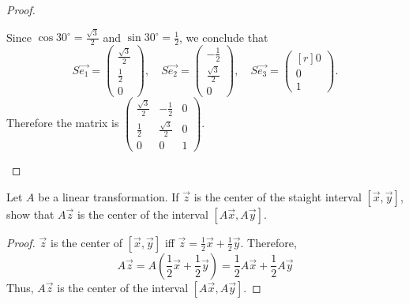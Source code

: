\documentclass{article}
\begin{document}
\begin{proof}
\begin{enumerate}
\begin{center}
      \end{center}
      Since $\cos30^\circ=\frac{\sqrt{3}}{2}$ and $\sin30^\circ=\frac{1}{2}$,
      we conclude that
      \[
        S\vec{e_1}= \begin{pmatrix} \frac{\sqrt{3}}{2}\\[0.2cm]\frac{1}{2}\\[0.2cm]0 \end{pmatrix},\quad
        S\vec{e_2}= \begin{pmatrix} -\frac{1}{2}\\[0.2cm]\frac{\sqrt{3}}{2}\\[0.2cm]0 \end{pmatrix},\quad
        S\vec{e_3}= \begin{pmatrix*}[r] 0\\0\\1 \end{pmatrix*}.
      \]
      Therefore the matrix is
      $ \begin{pmatrix}
        \frac{\sqrt{3}}{2} & -\frac{1}{2} & 0\\[0.2cm]
        \frac{1}{2} & \frac{\sqrt{3}}{2} & 0\\[0.2cm]
        0 & 0 &1
      \end{pmatrix}. $
  \end{enumerate}
\end{proof}
\begin{exercise}
  Let $A$ be a linear transformation. If $\vec{z}$ is the center of the
  staight interval $[\vec{x},\vec{y}]$, show that $A\vec{z}$ is the
  center of the interval $[A\vec{x}, A\vec{y}]$.
\end{exercise}
\begin{proof}
  $\vec{z}$ is the center of $[\vec{x}, \vec{y}]$ iff 
  $\vec{z}=\frac{1}{2}\vec{x}+\frac{1}{2}\vec{y}$. Therefore,
  \[
    A\vec{z}=A\left(\frac{1}{2}\vec{x}+\frac{1}{2}\vec{y}\right)
    =\frac{1}{2}A\vec{x}+\frac{1}{2}A\vec{y}
  \]
  Thus, $A\vec{z}$ is the center of the interval $[A\vec{x}, A\vec{y}]$.
\end{proof}
\end{document}
